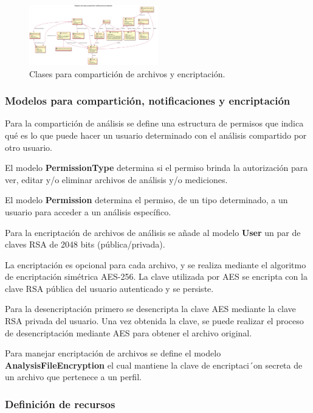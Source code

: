     \begin{figure}[h]
        \centering
        \includegraphics[width=0.5\textwidth]{img/dc_sprint8}
        \caption{Clases para compartición de archivos y encriptación.}
		\label{8-clases_compartición_encriptación}
    \end{figure}

\subsubsection{Modelos para compartición, notificaciones y encriptación}

Para la compartición de análisis se define una estructura de permisos que indica qué es lo que puede hacer un usuario determinado con el análisis compartido por otro usuario.

El modelo \textbf{PermissionType} determina si el permiso brinda la autorización para ver, editar y/o eliminar archivos de análisis y/o mediciones.

El modelo \textbf{Permission} determina el permiso, de un tipo determinado, a un usuario para acceder a un análisis específico.

Para la encriptación de archivos de análisis se añade al modelo \textbf{User} un par de claves RSA de 2048 bits (pública/privada).

La encriptación es opcional para cada archivo, y se realiza mediante el algoritmo de encriptación simétrica AES-256. La clave utilizada por AES se encripta con la clave RSA pública del usuario autenticado y se persiste.

Para la desencriptación primero se desencripta la clave AES mediante la clave RSA privada del usuario. Una vez obtenida la clave, se puede realizar el proceso de desencriptación mediante AES para obtener el archivo original.

Para manejar encriptación de archivos se define el modelo \textbf{AnalysisFileEncryption} el cual mantiene la clave de encriptaci´on secreta de un archivo que pertenece a un perfil.

\subsubsection{Definición de recursos}


